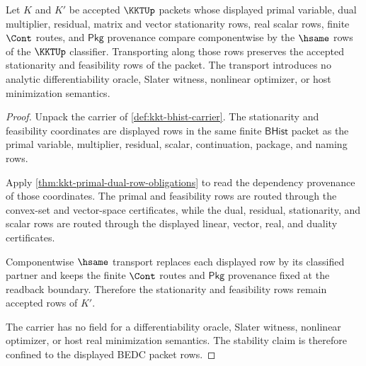 \begin{theorem}
\label{thm:kkt-stationarity-feasibility-stability}
Let $K$ and $K'$ be accepted $\KKTUp$ packets whose displayed primal variable, dual multiplier, residual, matrix and vector stationarity rows, real scalar rows, finite $\Cont$ routes, and $\mathsf{Pkg}$ provenance compare componentwise by the $\hsame$ rows of the $\KKTUp$ classifier. Transporting along those rows preserves the accepted stationarity and feasibility rows of the packet. The transport introduces no analytic differentiability oracle, Slater witness, nonlinear optimizer, or host minimization semantics.
\end{theorem}
\begin{proof}
Unpack the carrier of \autoref{def:kkt-bhist-carrier}. The stationarity and feasibility coordinates are displayed rows in the same finite $\mathsf{BHist}$ packet as the primal variable, multiplier, residual, scalar, continuation, package, and naming rows.

Apply \autoref{thm:kkt-primal-dual-row-obligations} to read the dependency provenance of those coordinates. The primal and feasibility rows are routed through the convex-set and vector-space certificates, while the dual, residual, stationarity, and scalar rows are routed through the displayed linear, vector, real, and duality certificates.

Componentwise $\hsame$ transport replaces each displayed row by its classified partner and keeps the finite $\Cont$ routes and $\mathsf{Pkg}$ provenance fixed at the readback boundary. Therefore the stationarity and feasibility rows remain accepted rows of $K'$.

The carrier has no field for a differentiability oracle, Slater witness, nonlinear optimizer, or host real minimization semantics. The stability claim is therefore confined to the displayed BEDC packet rows.
\end{proof}

